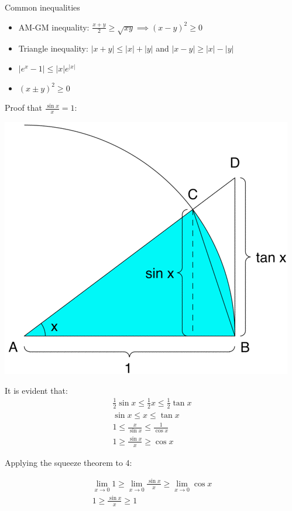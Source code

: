 \begin{mybox}{Common inequalities}
\begin{itemize}
    \item AM-GM inequality: $\frac{x+y}{2}\geq \sqrt{xy}\implies (x-y)^2\geq 0$
    \item Triangle inequality: $|x+y|\leq |x|+|y|$ and $|x-y|\geq |x|-|y|$
    \item $|e^x-1|\leq |x|e^{|x|}$
    \item $(x\pm y)^2\geq 0$
\end{itemize}
\end{mybox}

Proof that $\frac{\sin x}{x}=1$:

\begin{center}
    \includegraphics[scale=0.4]{figures/Screen Shot 2021-04-21 at 10.59.12 AM.png}
\end{center}

It is evident that:
\begin{gather}
    \frac{1}{2}\sin x\leq \frac{1}{2}x\leq \frac{1}{2}\tan x\\
    \sin x\leq x \leq \tan x\\
    1\leq \frac{x}{\sin x}\leq \frac{1}{\cos x}\\
    1\geq \frac{\sin x}{x}\geq \cos x
\end{gather}

Applying the squeeze theorem to 4:

\begin{gather*}
    \lim_{x\to 0}1\geq \lim_{x\to 0}\frac{\sin x}{x}\geq \lim_{x\to 0} \cos x\\
    1\geq \frac{\sin x}{x}\geq 1
\end{gather*}

